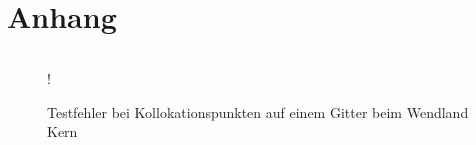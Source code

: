 \chapter{Anhang}
\label{cha:Anhang}

$\mbox{}$

\begin{figure}[H]
\centering
\resizebox {.8\columnwidth} {!} {

}
\caption{Testfehler bei Kollokationspunkten auf einem Gitter beim Wendland Kern}
\label{fig:wendland-error-grid-both}
\end{figure}